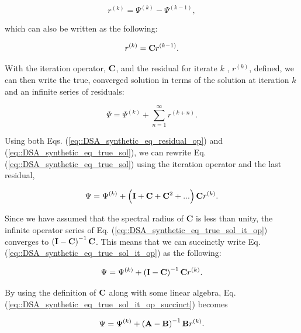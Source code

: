 \begin{equation}
\label{eq::DSA_synthetic_eq_residual}
r^{(k)} = \Psi^{(k)} - \Psi^{(k-1)} ,
\end{equation}

\noindent which can also be written as the following:

\begin{equation}
\label{eq::DSA_synthetic_eq_residual_op}
r^{(k)} = {\bf C}r^{(k-1)} .
\end{equation}

With the iteration operator, ${\bf C}$, and the residual for iterate $k$ , $r^{(k)}$, defined, we can then write the true, converged solution in terms of the solution at iteration $k$ and an infinite series of residuals:

\begin{equation}
\label{eq::DSA_synthetic_eq_true_sol}
\Psi = \Psi^{(k)} + \sum_{n=1}^{\infty} r^{(k+n)} .
\end{equation}

\noindent Using both Eqs. (\ref{eq::DSA_synthetic_eq_residual_op}) and (\ref{eq::DSA_synthetic_eq_true_sol}), we can rewrite Eq. (\ref{eq::DSA_synthetic_eq_true_sol}) using the iteration operator and the last residual,

\begin{equation}
\label{eq::DSA_synthetic_eq_true_sol_it_op}
\Psi = \Psi^{(k)} + \left(  {\bf I} + {\bf C} + {\bf C}^2 + ...  \right) {\bf C} r^{(k)}.
\end{equation}

\noindent Since we have assumed that the spectral radius of {\bf C} is less than unity, the infinite operator series of Eq. (\ref{eq::DSA_synthetic_eq_true_sol_it_op}) converges to $\left(  {\bf I} - {\bf C}   \right)^{-1} {\bf C}$. This means that we can succinctly write Eq. (\ref{eq::DSA_synthetic_eq_true_sol_it_op}) as the following:

\begin{equation}
\label{eq::DSA_synthetic_eq_true_sol_it_op_succinct}
\Psi = \Psi^{(k)} + \left(  {\bf I} - {\bf C}   \right)^{-1} {\bf C} r^{(k)}.
\end{equation}

\noindent By using the definition of ${\bf C}$ along with some linear algebra, Eq. (\ref{eq::DSA_synthetic_eq_true_sol_it_op_succinct}) becomes 

\begin{equation}
\label{eq::DSA_synthetic_eq_true_sol_orig_ops}
\Psi = \Psi^{(k)} + \left(  {\bf A} - {\bf B}   \right)^{-1} {\bf B} r^{(k)}.
\end{equation}

